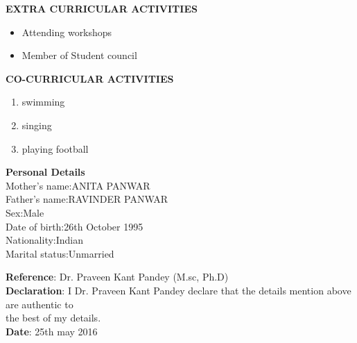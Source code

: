\documentclass{article}
\begin{document}
\begin{flushleft}
	\vspace{0.2in}
	
		\textbf{EXTRA CURRICULAR ACTIVITIES}
	\begin{itemize}
		\item Attending workshops
	 	\item Member of Student council
	\end{itemize}
\end{flushleft}

\begin{flushleft}
	\vspace{0.2in}
	
		\textbf{CO-CURRICULAR ACTIVITIES}
	\begin{enumerate}
		\item swimming
	 	\item singing
		\item playing football
	\end{enumerate}
\end{flushleft}

\begin{flushleft}
	\vspace{0.4in}
	\textbf{Personal Details}\\
	\hspace{1.5in}Mother's name:\hspace{.08in}ANITA PANWAR\\
	\hspace{1.5in}Father's name:\hspace{.1in}RAVINDER PANWAR\\
	\hspace{1.5in}Sex:\hspace{.75in}Male\\
	\hspace{1.5in}Date of birth:\hspace{.15in}26th October 1995\\
	\hspace{1.5in}Nationality:\hspace{.27in}Indian\\
	\hspace{1.5in}Marital status:\hspace{.09in}Unmarried\\
\end{flushleft}

\begin{flushleft}
	\vspace{0.1in}
	\textbf{Reference}\hspace{0.36in}: Dr. Praveen Kant Pandey (M.sc, Ph.D)\\
	\textbf{Declaration}\hspace{0.25in}: I Dr. Praveen Kant Pandey declare that the details mention above are authentic to \\
\hspace{1.15in}the best of my details.\\
	\textbf{Date}\hspace{0.73in}: 25th may 2016
\end{flushleft}
\end{document}
